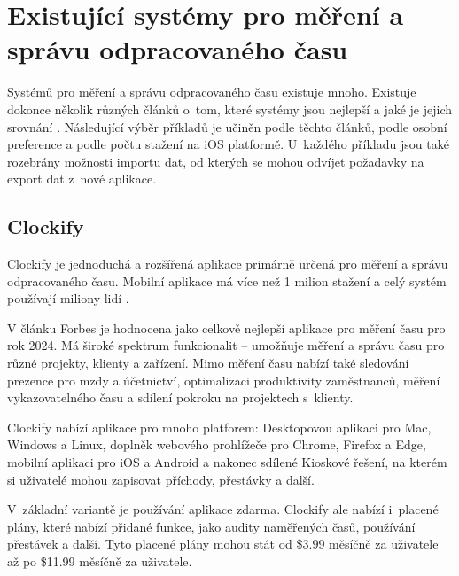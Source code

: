 \section{Existující systémy pro měření a správu odpracovaného času}

Systémů pro měření a správu odpracovaného času existuje mnoho. Existuje dokonce několik různých článků o~tom, které systémy jsou nejlepší a jaké je jejich srovnání \cite{forbes-tracking-apps-article} \cite{zapier-tracking-apps-article}. Následující výběr příkladů je učiněn podle těchto článků, podle osobní preference a podle počtu stažení na iOS platformě. U~každého příkladu jsou také rozebrány možnosti importu dat, od kterých se mohou odvíjet požadavky na export dat z~nové aplikace.

\subsection{Clockify}

Clockify je jednoduchá a rozšířená aplikace primárně určená pro měření a správu odpracovaného času. Mobilní aplikace má více než 1 milion stažení \cite{clockify-app-magic} a celý systém používají miliony lidí \cite{clockify-customers}. 

V článku Forbes je hodnocena jako celkově nejlepší aplikace pro měření času pro rok 2024. Má široké spektrum funkcionalit – umožňuje měření a správu času pro různé projekty, klienty a zařízení. Mimo měření času nabízí také sledování prezence pro mzdy a účetnictví, optimalizaci produktivity zaměstnanců, měření vykazovatelného času a sdílení pokroku na projektech s~klienty. \cite{forbes-tracking-apps-article}

Clockify nabízí aplikace pro mnoho platforem: Desktopovou aplikaci pro Mac, Windows a Linux, doplněk webového prohlížeče pro Chrome, Firefox a Edge, mobilní aplikaci pro iOS a Android a nakonec sdílené Kioskové řešení, na kterém si uživatelé mohou zapisovat příchody, přestávky a další. \cite{clockify-apps}

V~základní variantě je používání aplikace zdarma. Clockify ale nabízí i~placené plány, které nabízí přidané funkce, jako audity naměřených časů, používání přestávek a další. Tyto placené plány mohou stát od \$3.99 měsíčně za uživatele až po \$11.99 měsíčně za uživatele. \cite{clockify-pricing} 

